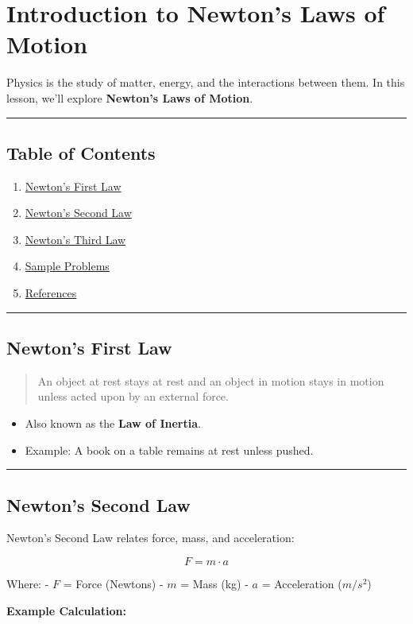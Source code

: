 \section{Introduction to Newton's Laws of
Motion}\label{introduction-to-newtons-laws-of-motion}

Physics is the study of matter, energy, and the interactions between
them. In this lesson, we'll explore \textbf{Newton's Laws of Motion}.

\begin{center}\rule{0.5\linewidth}{0.5pt}\end{center}

\subsection{Table of Contents}\label{table-of-contents}

\begin{enumerate}
\def\labelenumi{\arabic{enumi}.}
\tightlist
\item
  \hyperref[newtons-first-law]{Newton's First Law}
\item
  \hyperref[newtons-second-law]{Newton's Second Law}
\item
  \hyperref[newtons-third-law]{Newton's Third Law}
\item
  \hyperref[sample-problems]{Sample Problems}
\item
  \hyperref[references]{References}
\end{enumerate}

\begin{center}\rule{0.5\linewidth}{0.5pt}\end{center}

\subsection{Newton's First Law}\label{newtons-first-law}

\begin{quote}
An object at rest stays at rest and an object in motion stays in motion
unless acted upon by an external force.
\end{quote}

\begin{itemize}
\tightlist
\item
  Also known as the \textbf{Law of Inertia}.
\item
  Example: A book on a table remains at rest unless pushed.
\end{itemize}

\begin{center}\rule{0.5\linewidth}{0.5pt}\end{center}

\subsection{Newton's Second Law}\label{newtons-second-law}

Newton's Second Law relates force, mass, and acceleration:

\[
F = m \cdot a
\]

Where: - \(F\) = Force (Newtons) - \(m\) = Mass (kg) - \(a\) =
Acceleration (\(m/s^2\))

\textbf{Example Calculation:}
